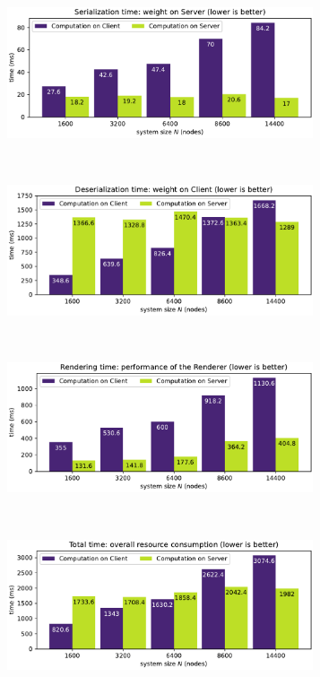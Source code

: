 \begin{center}
	\begin{figure}[htb]
		\centering
		\begin{subfigure}[t]{0.45\textwidth}
			\includegraphics[width=0.99\textwidth]{figures/serialization-time}
		\end{subfigure}%
		~
		\begin{subfigure}[t]{0.45\textwidth}
			\includegraphics[width=0.99\textwidth]{figures/deserialization-time}
		\end{subfigure}
		~
		\begin{subfigure}[t]{0.45\textwidth}
			\includegraphics[width=0.99\textwidth]{figures/rendering-time}
		\end{subfigure}
		~
		\begin{subfigure}[t]{0.45\textwidth}
			\includegraphics[width=0.99\textwidth]{figures/total-time}

\end{subfigure}
\end{figure}
\end{center}
